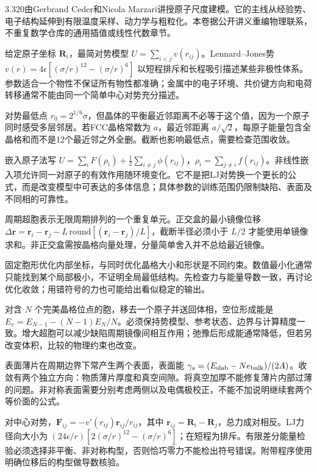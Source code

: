 3.320由Gerbrand Ceder和Nicola Marzari讲授原子尺度建模。它的主线从经验势、电子结构延伸到有限温度采样、动力学与粗粒化。本卷据公开讲义重编物理联系，不重复数学仓库的通用插值或线性代数章节。

给定原子坐标 $\mathbf R_i$，最简对势模型 $U=\sum_{i<j}v(r_{ij})$。Lennard--Jones势 $v(r)=4\epsilon[(\sigma/r)^{12}-(\sigma/r)^6]$ 以短程排斥和长程吸引描述某些非极性体系。参数适合一个物性不保证所有物性都准确；金属中的电子环境、共价键方向和电荷转移通常不能由同一个简单中心对势充分描述。

对势最低点 $r_0=2^{1/6}\sigma$，但晶体的平衡最近邻距离不必等于这个值，因为一个原子同时感受多层邻居。若FCC晶格常数为 $a$，最近邻距离 $a/\sqrt2$，每原子能量包含全晶格和而不是12个最近邻之外全删。截断也影响最低点，需要检查范围收敛。

嵌入原子法写 $U=\sum_iF(\rho_i)+\tfrac12\sum_{i\ne j}\phi(r_{ij})$，$\rho_i=\sum_{j\ne i}f(r_{ij})$。非线性嵌入项允许同一对原子的有效作用随环境变化。它不是把LJ对势换一个更长的公式，而是改变模型中可表达的多体信息；具体参数的训练范围仍限制缺陷、表面及不同相的可靠性。

周期超胞表示无限周期排列的一个重复单元。正交盒的最小镜像位移 $\Delta\mathbf r=\mathbf r_i-\mathbf r_j-L\,\mathrm{round}[(\mathbf r_i-\mathbf r_j)/L]$，截断半径必须小于 $L/2$ 才能使用单镜像求和。非正交盒需按晶格向量处理，分量简单舍入并不总给最近镜像。

固定胞形优化内部坐标，与同时优化晶格大小和形状是不同约束。数值最小化通常只能找到某个局部极小，不证明全局最低结构。先检查力与能量导数一致，再讨论优化收敛；用错符号的力也可能给出看似稳定的输出。

对含 $N$ 个完美晶格位点的胞，移去一个原子并送回体相，空位形成能是 $E_v=E_{N-1}-(N-1)E_N/N$。必须保持势模型、参考状态、边界与计算精度一致。增大超胞可以减少缺陷周期镜像间相互作用；弛豫后形成能通常降低，但若另改变体积，比较的物理约束也改变。

表面薄片在周期边界下常产生两个表面，表面能 $\gamma_s=(E_{\rm slab}-N e_{\rm bulk})/(2A)$。收敛有两个独立方向：物质薄片厚度和真空间隙。将真空加厚不能修复薄片内部过薄的问题。非对称表面需要分别考虑两侧以及电偶极校正，不能不加说明继续套两个等价面的公式。

对中心对势，$\mathbf F_{ij}=-v'(r_{ij})\mathbf r_{ij}/r_{ij}$，其中 $\mathbf r_{ij}=\mathbf R_i-\mathbf R_j$，总力成对相反。LJ力径向大小为 $(24\epsilon/r)[2(\sigma/r)^{12}-(\sigma/r)^6]$；在短程为排斥。有限差分能量检验必须选择非平衡、非对称构型，否则恰巧零力不能检出符号错误。附带程序使用明确位移后的构型做导数核验。

